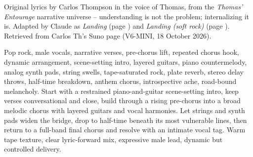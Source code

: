 
\label{sec:i-understand}
\begin{notes}
Original lyrics by Carlos Thompson in the voice of Thomas, from the \emph{Thomas' Entourage} narrative universe -- understanding is not the problem; internalizing it is. Adapted by Claude as \emph{Landing} (page \pageref{sec:landing}) and \emph{Landing (soft rock)} (page \pageref{sec:landing-soft-rock}). Retrieved from Carlos Th's Suno page (V6-MINI, 18 October 2026).
\end{notes}
\begin{style}
Pop rock, male vocals, narrative verses, pre-chorus lift, repeated chorus hook, dynamic arrangement, scene-setting intro, layered guitars, piano countermelody, analog synth pads, string swells, tape-saturated rock, plate reverb, stereo delay throws, half-time breakdown, anthem chorus, introspective ache, road-bound melancholy. Start with a restrained piano-and-guitar scene-setting intro, keep verses conversational and close, build through a rising pre-chorus into a broad melodic chorus with layered guitars and vocal harmonies. Let strings and synth pads widen the bridge, drop to half-time beneath its most vulnerable lines, then return to a full-band final chorus and resolve with an intimate vocal tag. Warm tape texture, clear lyric-forward mix, expressive male lead, dynamic but controlled delivery.
\end{style}
